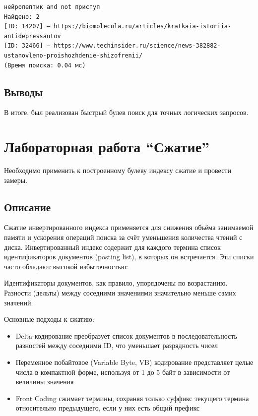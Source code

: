 \documentclass[pdf, unicode, 12pt, a4paper, oneside, fleqn]{article}
\begin{document}
\begin{verbatim}
нейролептик and not приступ
Найдено: 2
[ID: 14207] — https://biomolecula.ru/articles/kratkaia-istoriia-antidepressantov
[ID: 32466] — https://www.techinsider.ru/science/news-382882-ustanovleno-proishozhdenie-shizofrenii/
(Время поиска: 0.04 мс)
\end{verbatim}

\subsection*{Выводы}
В итоге, был реализован быстрый булев поиск для точных логических запросов.

\pagebreak

\section{Лабораторная работа  \enquote{Сжатие}}

Необходимо применить к построенному булеву индексу сжатие и провести замеры.

\subsection*{Описание}
Сжатие инвертированного индекса применяется для снижения объёма занимаемой памяти и ускорения операций поиска за счёт уменьшения количества чтений с диска. Инвертированный индекс содержит для каждого термина список идентификаторов документов (posting list), в которых он встречается. Эти списки часто обладают высокой избыточностью:

Идентификаторы документов, как правило, упорядочены по возрастанию.
Разности (дельты) между соседними значениями значительно меньше самих значений.

Основные подходы к сжатию:
\begin{itemize}
    \item Delta-кодирование преобразует список документов в последовательность разностей между соседними ID, что уменьшает разрядность чисел
    \item Переменное побайтовое (Variable Byte, VB) кодирование представляет целые числа в компактной форме, используя от 1 до 5 байт в зависимости от величины значения
    \item Front Coding сжимает термины, сохраняя только суффикс текущего термина относительно предыдущего, если у них есть общий префикс
\end{itemize}
\end{document}

